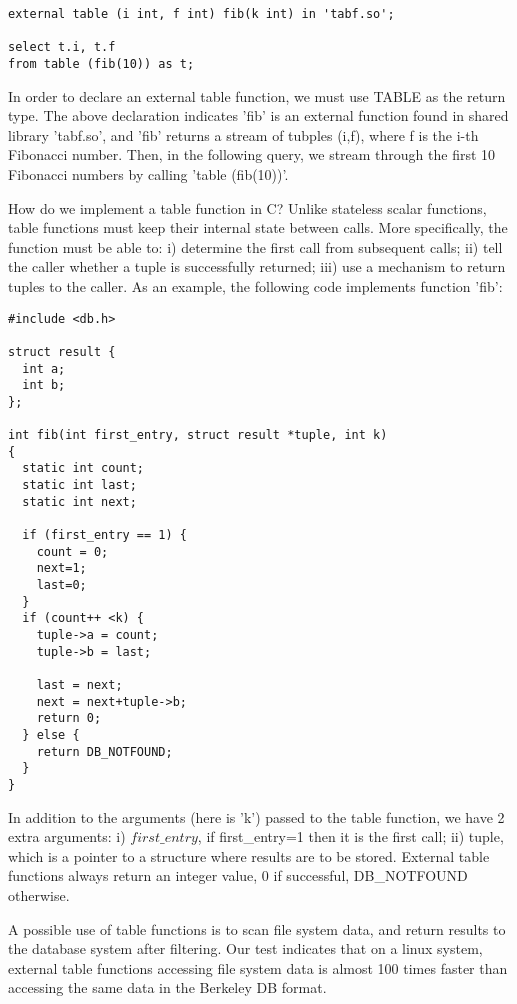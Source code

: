 \begin{verbatim}
external table (i int, f int) fib(k int) in 'tabf.so';

select t.i, t.f
from table (fib(10)) as t;
\end{verbatim}

In order to declare an external table function, we must use TABLE as
the return type. The above declaration indicates 'fib' is an external
function found in shared library 'tabf.so', and 'fib' returns a stream
of tubples (i,f), where f is the i-th Fibonacci number. Then, in the
following query, we stream through the first 10 Fibonacci numbers by
calling 'table (fib(10))'.

How do we implement a table function in C? Unlike stateless scalar
functions, table functions must keep their internal state between
calls. More specifically, the function must be able to: i) determine
the first call from subsequent calls; ii) tell the caller whether a
tuple is successfully returned; iii) use a mechanism to return tuples
to the caller. As an example, the following code implements function
'fib':

\begin{verbatim}
#include <db.h>

struct result {
  int a;
  int b;
};

int fib(int first_entry, struct result *tuple, int k)
{
  static int count;
  static int last;
  static int next;

  if (first_entry == 1) {
    count = 0;
    next=1;
    last=0;
  }
  if (count++ <k) {
    tuple->a = count;
    tuple->b = last;

    last = next;
    next = next+tuple->b;
    return 0;
  } else {
    return DB_NOTFOUND;
  }
}
\end{verbatim}

In addition to the arguments (here is 'k') passed to the table
function, we have 2 extra arguments: i) $first\_entry$, if
first\_entry=1 then it is the first call; ii) tuple, which is a
pointer to a structure where results are to be stored. External
table functions always return an integer value, 0 if successful,
DB\_NOTFOUND otherwise.

A possible use of table functions is to scan file system data, and
return results to the database system after filtering. Our test
indicates that on a linux system, external table functions accessing
file system data is almost 100 times faster than accessing the same
data in the Berkeley DB format.


